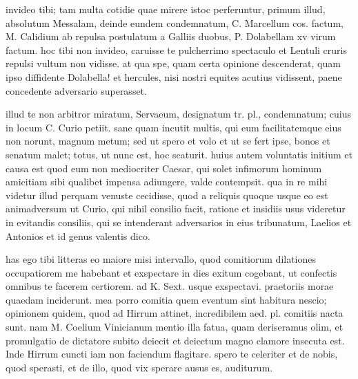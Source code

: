 


 invideo tibi; tam multa cotidie quae mirere istoc perferuntur, primum illud, absolutum Messalam, deinde eundem condemnatum, C. Marcellum cos. factum, M. Calidium ab repulsa postulatum a Galliis duobus, P. Dolabellam xv virum factum. hoc tibi non invideo, caruisse te pulcherrimo spectaculo et Lentuli cruris repulsi vultum non vidisse. at qua spe, quam certa opinione descenderat, quam ipso diffidente Dolabella! et hercules, nisi nostri equites acutius vidissent, paene concedente adversario superasset.

 illud te non arbitror miratum, Servaeum, designatum tr. pl., condemnatum; cuius in locum C. Curio petiit. sane quam incutit multis, qui eum facilitatemque eius non norunt, magnum metum; sed ut spero et volo et ut se fert ipse, bonos et senatum malet; totus, ut nunc est, hoc scaturit. huius autem voluntatis initium et causa est quod eum non mediocriter Caesar, qui solet infimorum hominum amicitiam sibi qualibet impensa adiungere, valde contempsit. qua in re mihi videtur illud perquam venuste cecidisse, quod a reliquis quoque usque eo est animadversum ut Curio, qui nihil consilio facit, ratione et insidiis usus videretur in evitandis consiliis, qui se intenderant adversarios in eius tribunatum, Laelios et Antonios et id genus valentis dico.

 has ego tibi litteras eo maiore misi intervallo, quod comitiorum dilationes occupatiorem me habebant et exspectare in dies exitum cogebant, ut confectis omnibus te facerem certiorem. ad K. Sext. usque exspectavi. praetoriis morae quaedam inciderunt. mea porro comitia quem eventum sint habitura nescio; opinionem quidem, quod ad Hirrum attinet, incredibilem aed. pl. comitiis nacta sunt. nam M. Coelium Vinicianum mentio illa fatua, quam deriseramus olim, et promulgatio de dictatore subito deiecit et deiectum magno clamore insecuta est. Inde Hirrum cuncti iam non faciendum flagitare. spero te celeriter et de nobis, quod sperasti, et de illo, quod vix sperare ausus es, auditurum.

